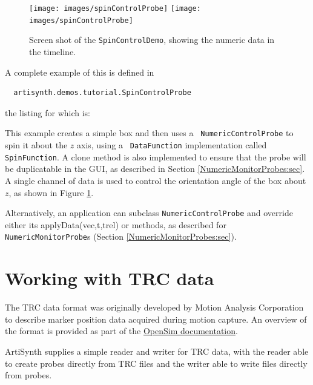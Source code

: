 \begin{figure}[ht]
\begin{center}
\iflatexml
 \texttt{[image: images/spinControlProbe]}
\else
 \texttt{[image: images/spinControlProbe]}
\fi
\end{center}
\caption{Screen shot of the {\tt SpinControlDemo}, showing the
numeric data in the timeline.}
\label{spinControlProbe:fig}
\end{figure}

A complete example
of this is defined in
%
\begin{verbatim}
  artisynth.demos.tutorial.SpinControlProbe
\end{verbatim}
%
the listing for which is:

\lstset{numbers=left}

\lstset{numbers=none}

This example creates a simple box and then uses a {\tt
NumericControlProbe} to spin it about the $z$ axis, using a {\tt
DataFunction} implementation called {\tt SpinFunction}. A clone method
is also implemented to ensure that the probe will be duplicatable in
the GUI, as described in Section \ref{NumericMonitorProbes:sec}.  A
single channel of data is used to control the orientation angle of the
box about $z$, as shown in Figure \ref{spinControlProbe:fig}.

Alternatively, an application can subclass {\tt NumericControlProbe}
and override either its %
{applyData(vec,t,trel)} or 
methods, as described for {\tt NumericMonitorProbe}s (Section
\ref{NumericMonitorProbes:sec}).

\section{Working with TRC data}

The TRC data format was originally developed by Motion Analysis Corporation to
describe marker position data acquired during motion capture. An overview of
the format is provided as part of the
\href{https://opensimconfluence.atlassian.net/wiki/spaces/OpenSim/pages/53089972/Marker+.trc+Files}{OpenSim
documentation}.

ArtiSynth supplies a simple reader and writer for TRC data, with the reader
able to create probes directly from TRC files and the writer able to write
files directly from probes.

